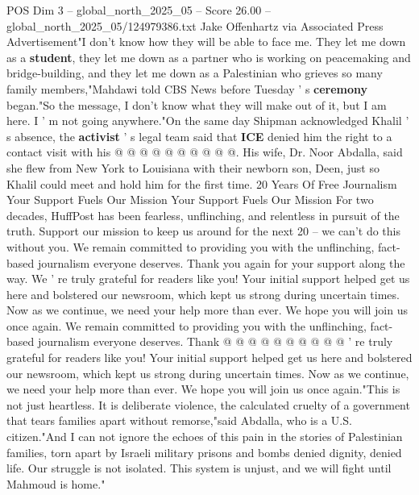 \begin{textsample}{POS Dim 3 – global\_north\_2025\_05 – Score 26.00 – global\_north\_2025\_05/124979386.txt}
Jake Offenhartz via Associated Press Advertisement"I don't know how they will be able to face me.
They let me down as a \textbf{student}, they let me down as a partner who is working on peacemaking and bridge-building, and they let me down as a Palestinian who grieves so many family members,"Mahdawi told CBS News before Tuesday ' s \textbf{ceremony} began."So the message, I don't know what they will make out of it, but I am here.
I ' m not going anywhere."On the same day Shipman acknowledged Khalil ' s absence, the \textbf{activist} ' s legal team said that \textbf{ICE} denied him the right to a contact visit with his @ @ @ @ @ @ @ @ @ @.
His wife, Dr.
Noor Abdalla, said she flew from New York to Louisiana with their newborn son, Deen, just so Khalil could meet and hold him for the first time. 20 Years Of Free Journalism Your Support Fuels Our Mission Your Support Fuels Our Mission For two decades, HuffPost has been fearless, unflinching, and relentless in pursuit of the truth.
Support our mission to keep us around for the next 20 -- we can't do this without you.
We remain committed to providing you with the unflinching, fact-based journalism everyone deserves.
Thank you again for your support along the way.
We ' re truly grateful for readers like you!
Your initial support helped get us here and bolstered our newsroom, which kept us strong during uncertain times.
Now as we continue, we need your help more than ever.
We hope you will join us once again.
We remain committed to providing you with the unflinching, fact-based journalism everyone deserves.
Thank @ @ @ @ @ @ @ @ @ @ ' re truly grateful for readers like you!
Your initial support helped get us here and bolstered our newsroom, which kept us strong during uncertain times.
Now as we continue, we need your help more than ever.
We hope you will join us once again."This is not just heartless.
It is deliberate violence, the calculated cruelty of a government that tears families apart without remorse,"said Abdalla, who is a U.S. citizen."And I can not ignore the echoes of this pain in the stories of Palestinian families, torn apart by Israeli military prisons and bombs denied dignity, denied life.
Our struggle is not isolated.
This system is unjust, and we will fight until Mahmoud is home."

\end{textsample}
